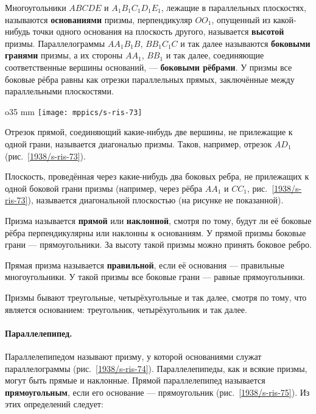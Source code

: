 {\sloppy

Многоугольники $ABCDE$ и $A_1B_1C_1D_1E_1$, лежащие в параллельных плоскостях, называются \textbf{основаниями} призмы, перпендикуляр $OO_1$, опущенный из какой-нибудь точки одного основания на плоскость другого, называется \textbf{высотой} призмы.
Параллелограммы $AA_1B_1B$, $BB_1C_1C$ и так далее называются \textbf{боковыми гранями} призмы, а их стороны $AA_1$, $BB_1$ и так далее, соединяющие соответственные вершины оснований, — \textbf{боковыми рёбрами}.
У призмы все боковые рёбра равны как отрезки параллельных прямых, заключённые между параллельными плоскостями.

}

\begin{wrapfigure}{o}{35 mm}
\vskip-0mm
\centering
\texttt{[image: mppics/s-ris-73]}
\caption{}\label{1938/s-ris-73}
\end{wrapfigure}

Отрезок прямой, соединяющий какие-нибудь две вершины, не прилежащие к одной грани, называется диагональю призмы.
Таков, например, отрезок $AD_1$ (рис.~\ref{1938/s-ris-73}).

Плоскость, проведённая через какие-нибудь два боковых ребра, не прилежащих к одной боковой грани призмы (например, через рёбра $AA_1$ и $CC_1$, рис.~\ref{1938/s-ris-73}), называется диагональной плоскостью (на рисунке не показанной).

Призма называется \textbf{прямой} или \textbf{наклонной}, смотря по тому, будут ли её боковые рёбра перпендикулярны или наклонны к основаниям.
У прямой призмы боковые грани — прямоугольники.
За высоту такой призмы можно принять боковое ребро.

Прямая призма называется \textbf{правильной}, если её основания — правильные многоугольники.
У такой призмы все боковые грани — равные прямоугольники.

Призмы бывают треугольные, четырёхугольные и так далее, смотря по тому, что является основанием: треугольник, четырёхугольник и так далее.


\paragraph{Параллелепипед.}\label{1938/s69}
Параллелепипедом называют призму, у которой основаниями служат параллелограммы (рис.~\ref{1938/s-ris-74}).
Параллелепипеды, как и всякие призмы, могут быть прямые и наклонные.
Прямой параллелепипед называется \textbf{прямоугольным}, если его основание — прямоугольник (рис.~\ref{1938/s-ris-75}).
Из этих определений следует:

